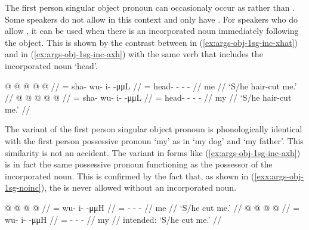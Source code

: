 The first person singular object pronoun can occasionaly occur as  rather than .
Some speakers do not allow  in this context and only have .
For speakers who do allow , it can be used when there is an incorporated noun immediately following the object.
This is shown by the contrast between  in (\ref{ex:args-obj-1sg-inc-xhat}) and  in (\ref{ex:args-obj-1sg-inc-axh}) with the same verb that includes the incorporated noun  ‘head’.

\pex\label{exx:args-obj-1sg-inc}%
\a\label{ex:args-obj-1sg-inc-xhat}%
%
\begingl
	\gla	{} @  @ {} @ {} @ {} @ {} //
	\glb	{}= sha- wu- i-  -μμL //
	\glc	{}= head- - -  - //
	\gld	me  {} {} {} {} //
	\glft	‘S/he hair-cut me.’
		//
\endgl
\a\label{ex:args-obj-1sg-inc-axh}%
%
\begingl
	\gla	{} @  @ {} @ {} @ {} @ {} //
	\glb	{}= sha- wu- i-  -μμL //
	\glc	{}= head- - -  - //
	\gld	my  {} {} {} {} //
	\glft	‘S/he hair-cut me.’
		//
\endgl
\xe

The  variant of the first person singular object pronoun is phonologically identical with the first person possessive pronoun  ‘my’ as in  ‘my dog’ and  ‘my father’.
This similarity is not an accident. The  variant in forms like (\ref{ex:args-obj-1sg-inc-axh}) is in fact the same possessive pronoun functioning as the possessor of the incorporated noun.
This is confirmed by the fact that, as shown in (\ref{exx:args-obj-1sg-noinc}), the  is never allowed without an incorporated noun.

\pex\label{exx:args-obj-1sg-noinc}%
\a\label{ex:args-obj-1sg-noinc-xhat}%
%
\begingl
	\gla	{} @  @ {} @ {} @ {} //
	\glb	{}= wu- i-  -μμH //
	\glc	{}= - -  - //
	\gld	me  //
	\glft	‘S/he cut me.’
		//
\endgl
\a\label{ex:args-obj-1sg-noinc-axh}%
\ljudge{*}%
%
\begingl
	\gla	{} @  @ {} @ {} @ {} //
	\glb	{}= wu- i-  -μμH //
	\glc	{}= - -  - //
	\gld	my  //
	\glft	intended: ‘S/he cut me.’
		//
\endgl
\xe

